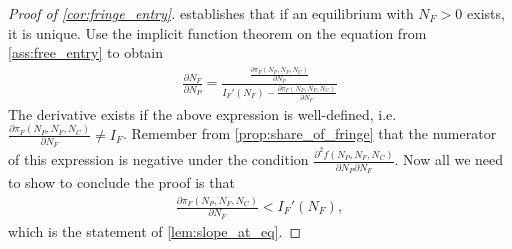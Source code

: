 \documentclass[a4paper]{article}
\begin{document}
\begin{proof}[Proof of \cref{cor:fringe_entry}]
     establishes that if an equilibrium with $N_F > 0$ exists, it is unique.
    Use the implicit function theorem on the equation from \cref{ass:free_entry} to obtain
    \begin{align*}
        \frac{\partial N_F}{\partial N_P} = \frac{\frac{\partial \pi_F(N_P, N_F, N_C)}{\partial N_P}}{I_F'(N_F) - \frac{\partial \pi_F (N_P, N_F, N_C)}{\partial N_F}}
    \end{align*}
    The derivative exists if the above expression is well-defined, i.e. $\frac{\partial \pi_F (N_P, N_F, N_C)}{\partial N_F} \neq I_F$.
    Remember from \cref{prop:share_of_fringe} that the numerator of this expression is negative under the condition $\frac{\partial^2 f(N_P, N_F, N_C)}{\partial N_P \partial N_F}$.
    Now all we need to show to conclude the proof is that
    \begin{align*}
        \frac{\partial \pi_F (N_P, N_F, N_C)}{\partial N_F} < I_F'(N_F),
    \end{align*}
    which is the statement of \cref{lem:slope_at_eq}.
\end{proof}
\end{document}

